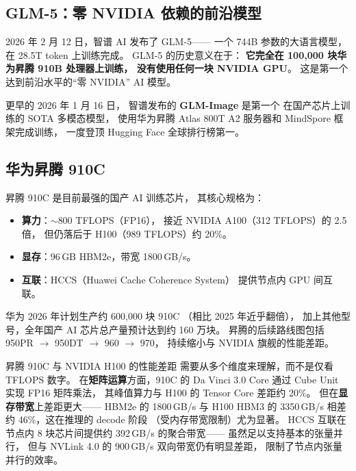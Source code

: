 \subsection{GLM-5：零 NVIDIA 依赖的前沿模型}

2026 年 2 月 12 日，智谱 AI 发布了 GLM-5——%
一个 744B 参数的大语言模型，
在 28.5T token 上训练完成。
GLM-5 的历史意义在于：
\textbf{它完全在 100,000 块华为昇腾 910B 处理器上训练，
没有使用任何一块 NVIDIA GPU}。
这是第一个达到前沿水平的``零 NVIDIA'' AI 模型。

更早的 2026 年 1 月 16 日，
智谱发布的 \textbf{GLM-Image} 是第一个%
在国产芯片上训练的 SOTA 多模态模型，
使用华为昇腾 Atlas 800T A2 服务器和 MindSpore 框架完成训练，
一度登顶 Hugging Face 全球排行榜第一。

\subsection{华为昇腾 910C}

昇腾 910C 是目前最强的国产 AI 训练芯片，
其核心规格为：
\begin{itemize}[noitemsep]
  \item \textbf{算力}：$\sim$800 TFLOPS（FP16），
        接近 NVIDIA A100（312 TFLOPS）的 2.5 倍，
        但仍落后于 H100（989 TFLOPS）约 20\%。
  \item \textbf{显存}：96\,GB HBM2e，带宽 1800\,GB/s。
  \item \textbf{互联}：HCCS（Huawei Cache Coherence System）
        提供节点内 GPU 间互联。
\end{itemize}

华为 2026 年计划生产约 600,000 块 910C
（相比 2025 年近乎翻倍），
加上其他型号，全年国产 AI 芯片总产量预计达到约 160 万块。
昇腾的后续路线图包括 950PR $\to$ 950DT $\to$ 960 $\to$ 970，
持续缩小与 NVIDIA 旗舰的性能差距。

昇腾 910C 与 NVIDIA H100 的性能差距
需要从多个维度来理解，而不是仅看 TFLOPS 数字。
在\textbf{矩阵运算}方面，910C 的 Da Vinci 3.0 Core
通过 Cube Unit 实现 FP16 矩阵乘法，
其峰值算力与 H100 的 Tensor Core 差距约 20\%。
但在\textbf{显存带宽}上差距更大——
HBM2e 的 1800\,GB/s 与 H100 HBM3 的 3350\,GB/s
相差约 46\%，这在推理的 decode 阶段
（受内存带宽限制）尤为显著。
HCCS 互联在节点内 8 块芯片间提供约 392\,GB/s 的聚合带宽——
虽然足以支持基本的张量并行，
但与 NVLink 4.0 的 900\,GB/s 双向带宽仍有明显差距，
限制了节点内张量并行的效率。

